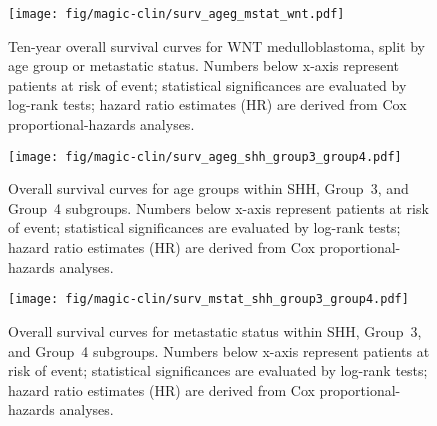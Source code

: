 \documentclass[11pt,letterpaper]{article}
\theoremstyle{definition}
\begin{document}
\begin{figure}[h]
	\begin{center}
		\texttt{[image: fig/magic-clin/surv\_ageg\_mstat\_wnt.pdf]}
	\end{center}
	\caption[Ten-year overall survival curves for WNT medulloblastoma]
	{
	Ten-year overall survival curves for WNT medulloblastoma, split by age group or metastatic status.
	Numbers below x-axis represent patients at risk of event; statistical significances are evaluated by log-rank tests; hazard ratio estimates (HR) are derived from Cox proportional-hazards analyses.
	}
	\label{fig:surv_ageg_mstat_wnt}
\end{figure}

\begin{figure}[h]
	\begin{center}
		\texttt{[image: fig/magic-clin/surv\_ageg\_shh\_group3\_group4.pdf]}
	\end{center}
	\caption[Overall survival curves for age groups within SHH, Group~3, and Group~4 subgroups]
	{
	Overall survival curves for age groups within SHH, Group~3, and Group~4 subgroups.
	Numbers below x-axis represent patients at risk of event; statistical significances are evaluated by log-rank tests; hazard ratio estimates (HR) are derived from Cox proportional-hazards analyses.
	}
	\label{fig:surv_ageg_shh_group3_group4}
\end{figure}

\begin{figure}[h]
	\begin{center}
		\texttt{[image: fig/magic-clin/surv\_mstat\_shh\_group3\_group4.pdf]}
	\end{center}
	\caption[Overall survival curves for metastatic status within SHH, Group~3, and Group~4 subgroups]
	{
	Overall survival curves for metastatic status within SHH, Group~3, and Group~4 subgroups.
	Numbers below x-axis represent patients at risk of event; statistical significances are evaluated by log-rank tests; hazard ratio estimates (HR) are derived from Cox proportional-hazards analyses.
	}
	\label{fig:surv_mstat_shh_group3_group4}
\end{figure}
\end{document}
